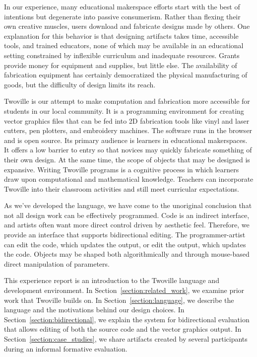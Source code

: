 \label{section:introduction}


In our experience, many educational makerspace efforts start with the best of intentions but degenerate into passive consumerism. Rather than flexing their own creative muscles, users download and fabricate designs made by others. One explanation for this behavior is that designing artifacts takes time, accessible tools, and trained educators, none of which may be available in an educational setting constrained by inflexible curriculum and inadequate resources. Grants provide money for equipment and supplies, but little else. The availability of fabrication equipment has certainly democratized the physical manufacturing of goods, but the difficulty of design limits its reach.

Twoville is our attempt to make computation and fabrication more accessible for students in our local community. It is a programming environment for creating vector graphics files that can be fed into 2D fabrication tools like vinyl and laser cutters, pen plotters, and embroidery machines. The software runs in the browser and is open source. Its primary audience is learners in educational makerspaces. It offers a low barrier to entry so that novices may quickly fabricate something of their own design. At the same time, the scope of objects that may be designed is expansive. Writing Twoville programs is a cognitive process in which learners draw upon computational and mathematical knowledge. Teachers can incorporate Twoville into their classroom activities and still meet curricular expectations.

As we've developed the language, we have come to the unoriginal conclusion that not all design work can be effectively programmed. Code is an indirect interface, and artists often want more direct control driven by aesthetic feel. Therefore, we provide an interface that supports bidirectional editing. The programmer-artist can edit the code, which updates the output, or edit the output, which updates the code. Objects may be shaped both algorithmically and through mouse-based direct manipulation of parameters.

This experience report is an introduction to the Twoville language and development environment. In Section~\ref{section:related_work}, we examine prior work that Twoville builds on. In Section~\ref{section:language}, we describe the language and the motivations behind our design choices. In Section~\ref{section:bidirectional}, we explain the system for bidirectional evaluation that allows editing of both the source code and the vector graphics output. In Section~\ref{section:case_studies}, we share artifacts created by several participants during an informal formative evaluation.
